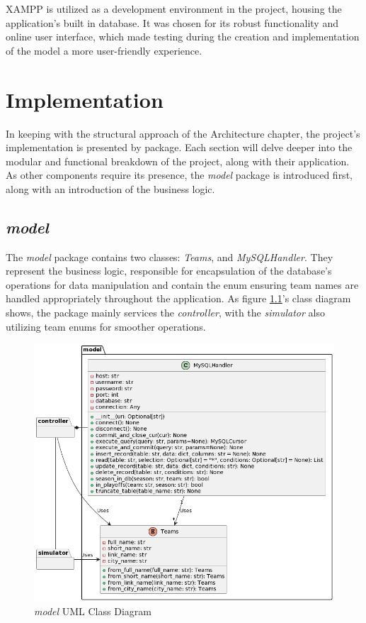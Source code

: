 \documentclass{thesis-ekf}
\theoremstyle{definition}
\theoremstyle{remark}
\begin{document}
XAMPP is utilized as a development environment in the project, housing the application's built in database. It was chosen for its robust functionality and online user interface, which made testing during the creation and implementation of the model a more user-friendly experience. 


\chapter{Implementation}
In keeping with the structural approach of the Architecture chapter, the project's implementation is presented by package. Each section will delve deeper into the modular and functional breakdown of the project, along with their application. As other components require its presence, the \emph{model} package is introduced first, along with an introduction of the business logic.

\section{\emph{model}}
The \emph{model} package contains two classes: \emph{Teams}, and \emph{MySQLHandler}. They represent the business logic, responsible for encapsulation of the database's operations for data manipulation and contain the enum ensuring team names are handled appropriately throughout the application. As figure \ref{img-model-class}'s class diagram shows, the package mainly services the \emph{controller}, with the \emph{simulator} also utilizing team enums for smoother operations.
\begin{figure}[th!]
	\centering
	\includegraphics[width=0.8\linewidth]{img/class/model}
	\caption{\emph{model} UML Class Diagram}
	\label{img-model-class}
\end{figure}
\end{document}
